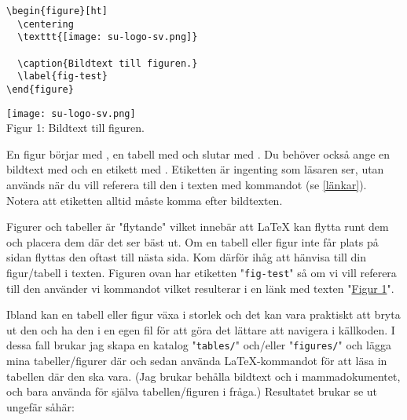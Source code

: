 \begin{multicols}{2}
\null \vfill
\noindent\begin{verbatim}
\begin{figure}[ht]
  \centering
  \texttt{[image: su-logo-sv.png]}

  \caption{Bildtext till figuren.}
  \label{fig-test}
\end{figure}
\end{verbatim}

\vfill \null
\columnbreak

{
  \centering
  \hypertarget{fig-test}{%
    \texttt{[image: su-logo-sv.png]}%
  } \\
  \vspace{.5em}
  Figur 1: Bildtext till figuren. \\ %
}
\end{multicols}

En figur börjar med , en tabell med
 och slutar med . Du behöver också
ange en bildtext med  och en etikett med
. Etiketten är ingenting som läsaren ser, utan används när du
vill referera till den i texten med kommandot  (se
\autoref{länkar}). Notera att etiketten alltid måste komma efter bildtexten.

Figurer och tabeller är "flytande" vilket innebär att \LaTeX{} kan flytta runt
dem och placera dem där det ser bäst ut. Om en tabell eller figur inte får
plats på sidan flyttas den oftast till nästa sida. Kom därför ihåg att hänvisa
till din figur/tabell i texten. Figuren ovan har etiketten "\texttt{fig-test}"
så om vi vill referera till den använder vi kommandot
 vilket resulterar i en länk med texten
"\hyperlink{fig-test}{Figur 1}".

Ibland kan en tabell eller figur växa i storlek och det kan vara praktiskt att
bryta ut den och ha den i en egen fil för att göra det lättare att navigera i
källkoden. I dessa fall brukar jag skapa en katalog "\texttt{tables/}"
och/eller "\texttt{figures/}" och lägga mina tabeller/figurer där och sedan
använda \LaTeX-kommandot  för att läsa in tabellen där den
ska vara. (Jag brukar behålla bildtext och  i
mammadokumentet, och bara använda  för själva
tabellen/figuren i fråga.) Resultatet brukar se ut ungefär såhär:

